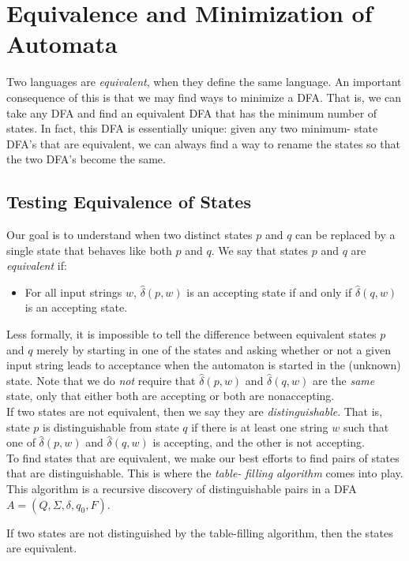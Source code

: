 \documentclass[]{article}
\begin{document}
\section*{Equivalence and Minimization of Automata}
  Two languages are \emph{equivalent}, when they define the same language. An
  important consequence of this is that we may find ways to minimize a DFA. That
  is, we can take any DFA and find an equivalent DFA that has the minimum number
  of states. In fact, this DFA is essentially unique: given any two minimum-
  state DFA's that are equivalent, we can always find a way to rename the states
  so that the two DFA's become the same.

  \subsection*{Testing Equivalence of States}
    Our goal is to understand when two distinct states $p$ and $q$ can be
    replaced by a single state that behaves like both $p$ and $q$. We say that
    states $p$ and $q$ are \emph{equivalent} if:
      \begin{itemize}
        \item For all input strings $w$, $\hat{\delta}(p, w)$ is an accepting
        state if and only if $\hat{\delta}(q, w)$ is an accepting state.
      \end{itemize}
    Less formally, it is impossible to tell the difference between equivalent
    states $p$ and $q$ merely by starting in one of the states and asking
    whether or not a given input string leads to acceptance when the automaton
    is started in the (unknown) state. Note that we do \emph{not} require that $
    \hat{\delta}(p, w)$ and $\hat{\delta}(q, w)$ are the \emph{same} state, only
    that either both are accepting or both are nonaccepting. \\
    \indent If two states are not equivalent, then we say they are
    \emph{distinguishable}. That is, state $p$ is distinguishable from state $q$
    if there is at least one string $w$ such that one of $\hat{\delta}(p,w)$ and
    $\hat{\delta}(q,w)$ is accepting, and the other is not accepting. \\
    \indent To find states that are equivalent, we make our best efforts to find
    pairs of states that are distinguishable. This is where the \emph{table-
    filling algorithm} comes into play. This algorithm is a recursive discovery
    of distinguishable pairs in a DFA $A = (Q, \Sigma, \delta, q_0, F)$.
      \begin{thm}
        If two states are not distinguished by the table-filling algorithm, then
        the states are equivalent.
      \end{thm}
\end{document}
